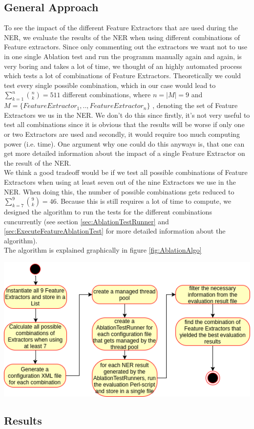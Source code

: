 \documentclass[11pt, english]{article}
\begin{document}
\subsection{General Approach}
\label{sec:AblationApproach}
To see the impact of the different Feature Extractors that are used during the NER, we evaluate the results of the NER when using different combinations of Feature extractors. Since only commenting out the extractors we want not to use in one single Ablation test and run the programm manually again and again, is very boring and takes a lot of time, we thought of an highly automated process which tests a lot of combinations of Feature Extractors. Theoretically we could test every single possible combination, which in our case would lead to $\sum_{k=1}^{n}\binom{n}{k} = 511$ different combinations, where $n = \left | M \right | = 9$ and $M = \{ FeatureExtractor_1, ..,  FeatureExtractor_n \}$ , denoting the set of Feature Extractors we us in the NER. We don't do this since firstly, it's not very useful to test all combinations since it is obvious that the results will be worse if only one or two Extractors are used and secondly, it would require too much computing power (i.e. time). One argument why one could do this anyways is, that one can get more detailed information about the impact of a single Feature Extractor on the result of the NER.\\
We think a good tradeoff would be if we test all possible combinations of Feature Extractors when using at least seven out of the nine Extractors we use in the NER. When doing this, the number of possible combinations gets reduced to $\sum_{k=7}^{9}\binom{9}{k} = 46$. Because this is still requires a lot of time to compute, we designed the algorithm to run the tests for the different combinations cuncurrently (see section \ref{sec:AblationTestRunner} and \ref{sec:ExecuteFeatureAblationTest} for more detailed information about the algorithm).\\
The algorithm is explained graphically in figure \ref{fig:AblationAlgo}

\includegraphics[scale=0.75]{gfx/ablationAlgo.png}
\label{fig:AblationAlgo}


\subsection{Results}
\end{document}
